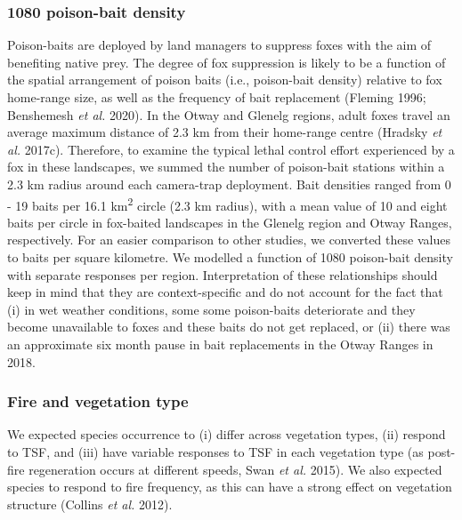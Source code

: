 \documentclass[11pt,a4paper,titlepage,twoside,openright]{style/unimelbthesis}
\begin{document}
\begin{mainmatter}
\hypertarget{poison-bait-density}{%
\subsubsection{1080 poison-bait density}\label{poison-bait-density}}

Poison-baits are deployed by land managers to suppress foxes with the aim of benefiting native prey. The degree of fox suppression is likely to be a function of the spatial arrangement of poison baits (i.e., poison-bait density) relative to fox home-range size, as well as the frequency of bait replacement (Fleming 1996; Benshemesh \emph{et al.} 2020). In the Otway and Glenelg regions, adult foxes travel an average maximum distance of 2.3 km from their home-range centre (Hradsky \emph{et al.} 2017c). Therefore, to examine the typical lethal control effort experienced by a fox in these landscapes, we summed the number of poison-bait stations within a 2.3 km radius around each camera-trap deployment. Bait densities ranged from 0 - 19 baits per 16.1 km\textsuperscript{2} circle (2.3 km radius), with a mean value of 10 and eight baits per circle in fox-baited landscapes in the Glenelg region and Otway Ranges, respectively. For an easier comparison to other studies, we converted these values to baits per square kilometre. We modelled a function of 1080 poison-bait density with separate responses per region. Interpretation of these relationships should keep in mind that they are context-specific and do not account for the fact that (i) in wet weather conditions, some some poison-baits deteriorate and they become unavailable to foxes and these baits do not get replaced, or (ii) there was an approximate six month pause in bait replacements in the Otway Ranges in 2018.

\hypertarget{fire-and-vegetation-type}{%
\subsubsection{Fire and vegetation type}\label{fire-and-vegetation-type}}

We expected species occurrence to (i) differ across vegetation types, (ii) respond to TSF, and (iii) have variable responses to TSF in each vegetation type (as post-fire regeneration occurs at different speeds, Swan \emph{et al.} 2015). We also expected species to respond to fire frequency, as this can have a strong effect on vegetation structure (Collins \emph{et al.} 2012).


\end{mainmatter}
\end{document}
